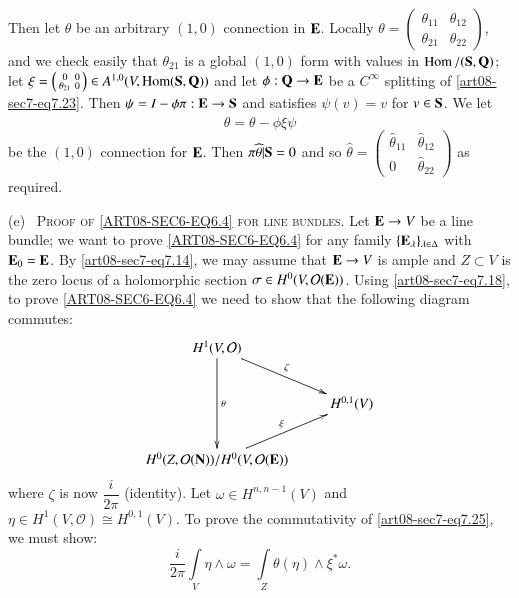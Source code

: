 Then let $\theta$ be an arbitrary $(1,0)$ connection in $\mathbf{E}$. Locally $\theta=\left(\begin{smallmatrix} \theta_{11} & \theta_{12}\\ \theta_{21} & \theta_{22}\end{smallmatrix}\right)$, and we check easily that $\theta_{21}$ is a global $(1,0)$ form with values in $\operatorname{\mathrm{Hom}}/(\mathbf{S},\mathbf{Q})$; let $\xi=\left(\begin{smallmatrix} 0 & 0\\ \theta_{21} & 0\end{smallmatrix}\right)\in A^{1,0}(V,\operatorname{\mathrm{Hom}}(\mathbf{S},\mathbf{Q}))$ and let $\phi:\mathbf{Q}\to \mathbf{E}$ be a $C^{\infty}$ splitting of \eqref{art08-sec7-eq7.23}. Then $\psi=I-\phi\pi:\mathbf{E}\to \mathbf{S}$ and satisfies $\psi(v)=v$ for $v\in \mathbf{S}$. We let
\begin{equation}
\widehat{\theta}=\theta-\phi\xi\psi\label{art08-sec7-eq7.24}
\end{equation}
be the $(1,0)$ connection for $\mathbf{E}$. Then $\pi\widehat{\theta}|\mathbf{S}=0$ and so $\widehat{\theta}=\left(\begin{smallmatrix} \widehat{\theta}_{11} & \widehat{\theta}_{12}\\ 0 & \widehat{\theta}_{22}\end{smallmatrix}\right)$ as required.

(e)~ \textsc{Proof of \eqref{ART08-SEC6-EQ6.4} for line bundles.} Let $\mathbf{E}\to V$ be a line bundle; we want to prove \eqref{ART08-SEC6-EQ6.4} for any family $\{\mathbf{E}_{\lambda}\}_{\lambda\in \Delta}$ with $\mathbf{E}_{0}=\mathbf{E}$. By \eqref{art08-sec7-eq7.14}, we may assume that $\mathbf{E}\to V$ is ample and $Z\subset V$ is the zero locus of a holomorphic section $\sigma\in H^{0}(V,\mathcal{O}(\mathbf{E}))$. Using \eqref{art08-sec7-eq7.18}, to prove \eqref{ART08-SEC6-EQ6.4} we need to show that the following diagram commutes:
\begin{equation}
\vcenter{\xymatrix{
H^{1}(V,\mathcal{O})\ar[dd]^-{\theta}\ar[dr]^-{\zeta} & \\
            & H^{0,1}(V)\\
H^{0}(Z,\mathcal{O}(\bfN))/H^{0}(V,\mathcal{O}(\bfE))\ar[ur]^{\xi} &
}}\label{art08-sec7-eq7.25}
\end{equation}
where $\zeta$ is now $\dfrac{i}{2\pi}$ (identity). Let $\omega\in H^{n,n-1}(V)$ and $\eta\in H^{1}(V,\mathcal{O})\cong H^{0,1}(V)$. To prove the commutativity of \eqref{art08-sec7-eq7.25}, we must show:
\begin{equation}
\frac{i}{2\pi}\int\limits_{V}\eta\wedge\omega=\int\limits_{Z}\theta(\eta)\wedge \xi^{*}\omega.\label{art08-sec7-eq7.26}
\end{equation}

